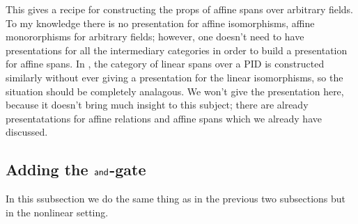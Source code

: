 This gives a recipe for constructing the props of affine spans over arbitrary fields.  To my knowledge there is no presentation for affine isomorphisms, affine monororphisms for arbitrary fields; however, one doesn't need to have presentations for all the intermediary categories in order to build a presentation for affine spans.  In \cite[??]{ih}, the category of linear spans over a PID is constructed similarly without ever giving a presentation for the linear isomorphisms, so the situation should be completely analagous.  We won't give the presentation here, because it doesn't bring much insight to this subject; there are already presentatations for affine relations and affine spans which we already have discussed.


\subsection{Adding the  \texorpdfstring{${\sf and}$}{and}-gate}
\label{sec:three}

In this ssubsection we do the same thing as in the previous two subsections but  in the nonlinear setting.


